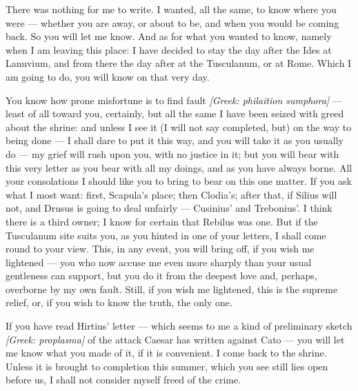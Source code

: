 

 There was nothing for me to write. I wanted, all the same, to know where you were --- whether you are away, or about to be, and when you would be coming back. So you will let me know. And as for what you wanted to know, namely when I am leaving this place: I have decided to stay the day after the Ides at Lanuvium, and from there the day after at the Tusculanum, or at Rome. Which I am going to do, you will know on that very day.

 You know how prone misfortune is to find fault \textit{[Greek: philaition sumphora]} --- least of all toward you, certainly, but all the same I have been seized with greed about the shrine: and unless I see it (I will not say completed, but) on the way to being done --- I shall dare to put it this way, and you will take it as you usually do --- my grief will rush upon you, with no justice in it; but you will bear with this very letter as you bear with all my doings, and as you have always borne. All your consolations I should like you to bring to bear on this one matter. If you ask what I most want: first, Scapula's place; then Clodia's; after that, if Silius will not, and Drusus is going to deal unfairly --- Cusinius' and Trebonius'. I think there is a third owner; I know for certain that Rebilus was one. But if the Tusculanum site suits you, as you hinted in one of your letters, I shall come round to your view. This, in any event, you will bring off, if you wish me lightened --- you who now accuse me even more sharply than your usual gentleness can support, but you do it from the deepest love and, perhaps, overborne by my own fault. Still, if you wish me lightened, this is the supreme relief, or, if you wish to know the truth, the only one.

 If you have read Hirtius' letter --- which seems to me a kind of preliminary sketch \textit{[Greek: proplasma]} of the attack Caesar has written against Cato --- you will let me know what you made of it, if it is convenient. I come back to the shrine. Unless it is brought to completion this summer, which you see still lies open before us, I shall not consider myself freed of the crime.
